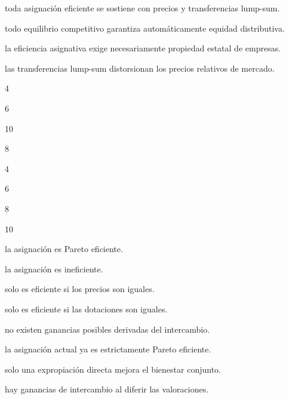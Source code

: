 \begin{opts}
    \item toda asignación eficiente se sostiene con precios y transferencias lump-sum.
    \item todo equilibrio competitivo garantiza automáticamente equidad distributiva.
    \item la eficiencia asignativa exige necesariamente propiedad estatal de empresas.
    \item las transferencias lump-sum distorsionan los precios relativos de mercado.
\end{opts}

\begin{opts}
    \item 4
    \item 6
    \item 10
    \item 8
\end{opts}

\begin{opts}
    \item 4
    \item 6
    \item 8
    \item 10
\end{opts}

\begin{opts}
    \item la asignación es Pareto eficiente.
    \item la asignación es ineficiente.
    \item solo es eficiente si los precios son iguales.
    \item solo es eficiente si las dotaciones son iguales.
\end{opts}

\begin{opts}
    \item no existen ganancias posibles derivadas del intercambio.
    \item la asignación actual ya es estrictamente Pareto eficiente.
    \item solo una expropiación directa mejora el bienestar conjunto.
    \item hay ganancias de intercambio al diferir las valoraciones.
\end{opts}

